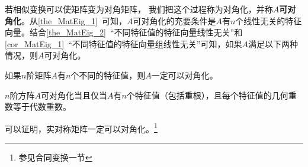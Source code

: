 若相似变换可以使矩阵变为对角矩阵， 我们把这个过程称为对角化，并称$A$\textbf{可对角化}。从\autoref{the_MatEig_1}~可知，$A$可对角化的充要条件是$A$有$n$个线性无关的特征向量。结合\autoref{the_MatEig_2}~“不同特征值的特征向量线性无关”和\autoref{cor_MatEig_1}~“不同特征值的特征向量组线性无关”可知，如果$A$满足以下两种情况，则$A$可对角化。
\begin{corollary}{}
如果$n$阶矩阵$A$有$n$个不同的特征值，则$A$一定可以对角化。
\end{corollary}
\begin{corollary}{}
$n$阶方阵$A$可对角化当且仅当$A$有$n$个特征值（包括重根），且每个特征值的几何重数等于代数重数。
\end{corollary}



可以证明，实对称矩阵一定可以对角化。\footnote{参见合同变换一节}

